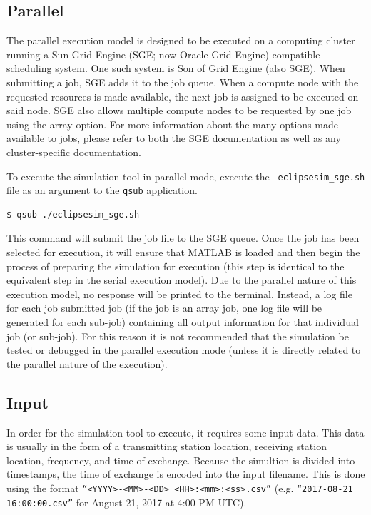 \documentclass[12pt,letterpaper]{article}
\begin{document}
\subsection{Parallel}
\label{sec:usage:parallel}

The parallel execution model is designed to be executed on a computing cluster
running a Sun Grid Engine (SGE; now Oracle Grid Engine) compatible scheduling
system. One such system is Son of Grid Engine (also SGE). When submitting a job,
SGE adds it to the job queue. When a compute node with the requested resources
is made available, the next job is assigned to be executed on said node. SGE
also allows multiple compute nodes to be requested by one job using the array
option. For more information about the many options made available to jobs,
please refer to both the SGE documentation as well as any cluster-specific
documentation.

To execute the simulation tool in parallel mode, execute the {\tt
  eclipsesim\_sge.sh} file as an argument to the {\tt qsub} application.

\begin{lstlisting}[language=bash]
  $ qsub ./eclipsesim_sge.sh
\end{lstlisting}

This command will submit the job file to the SGE queue. Once the job has been
selected for execution, it will ensure that MATLAB is loaded and then begin the
process of preparing the simulation for execution (this step is identical to the
equivalent step in the serial execution model). Due to the parallel nature of
this execution model, no response will be printed to the terminal. Instead, a
log file for each job submitted job (if the job is an array job, one log file
will be generated for each sub-job) containing all output information for that
individual job (or sub-job). For this reason it is not recommended that the
simulation be tested or debugged in the parallel execution mode (unless it is
directly related to the parallel nature of the execution).

\subsection{Input}
\label{sec:usage:input}

In order for the simulation tool to execute, it requires some input data. This
data is usually in the form of a transmitting station location, receiving
station location, frequency, and time of exchange. Because the simultion is
divided into timestamps, the time of exchange is encoded into the input
filename. This is done using the format {\tt ``<YYYY>-<MM>-<DD>
  <HH>:<mm>:<ss>.csv''} (e.g. {\tt ``2017-08-21 16:00:00.csv''} for August 21,
2017 at 4:00 PM UTC).
\end{document}
